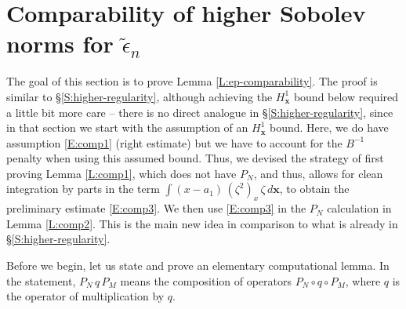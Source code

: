 \documentclass[12pt,letterpaper]{amsart}
\theoremstyle{remark}
\numberwithin{equation}{section}
\numberwithin{theorem}{section}
\numberwithin{table}{section}
\begin{document}
\section{Comparability of higher Sobolev norms for $\tilde \epsilon_n$}
\label{S:Sobolev-comparability}

The goal of this section is to prove Lemma \ref{L:ep-comparability}. The proof is similar to \S\ref{S:higher-regularity}, although achieving the $H_{\mathbf{x}}^1$ bound below required a little bit more care -- there is no direct analogue in \S\ref{S:higher-regularity}, since in that section we start with the assumption of an $H_{\mathbf{x}}^1$ bound.  Here, we do have assumption \eqref{E:comp1} (right estimate) but we have to account for the $B^{-1}$ penalty when using this assumed bound.  Thus, we devised the strategy of first proving Lemma \ref{L:comp1}, which does not have $P_N$, and thus, allows for clean integration by parts in the term $\int (x-a_1) \, (\zeta^2)_x \, \zeta \, d\mathbf{x}$, to obtain the preliminary estimate \eqref{E:comp3}.  We then use \eqref{E:comp3} in the $P_N$ calculation in Lemma \ref{L:comp2}.  This is the main new idea in comparison to what is already in \S\ref{S:higher-regularity}.  

Before we begin, let us state and prove an elementary computational lemma.  In the statement, $P_N \, q \, P_M$ means the composition of operators $P_N \circ q \circ P_M$, where $q$ is the operator of multiplication by $q$.
\end{document}
